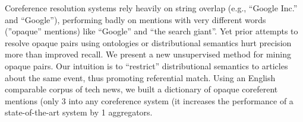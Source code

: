 Coreference resolution systems rely heavily on string overlap (e.g., ``Google Inc.'' and ``Google''), performing badly on mentions with very different words
 (''opaque'' mentions) like ``Google'' and ``the search giant''. Yet prior attempts to
 resolve opaque pairs using ontologies or distributional semantics hurt
 precision more than improved recall. We present a new unsupervised method for
 mining opaque pairs. Our intuition is to ``restrict'' distributional semantics to
 articles about the same event, thus promoting referential match. Using an
 English comparable corpus of tech news, we built a dictionary of opaque
 coreferent mentions (only 3%
 into any coreference system (it increases the performance of a state-of-the-art
 system by 1%
 aggregators.

